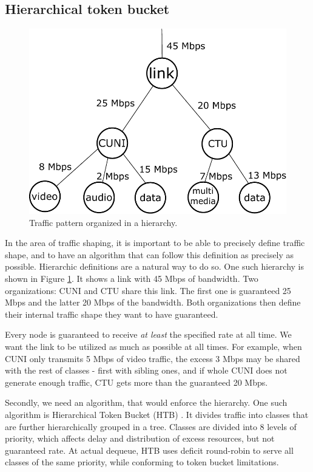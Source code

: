 \subsection{Hierarchical token bucket}
\begin{figure}
	\centering
	\includegraphics[width=137mm]{drawings/hierarchy}
	\caption{Traffic pattern organized in a hierarchy.}
	
	\label{fig10:hierarchy}
\end{figure}
In the area of traffic shaping, it is important to be able to precisely define traffic shape, and to have an algorithm that can follow this definition as precisely as possible. Hierarchic definitions are a natural way to do so. One such hierarchy is shown in Figure \ref{fig10:hierarchy}. It shows a link with 45 Mbps of bandwidth. Two organizations: CUNI and CTU share this link. The first one is guaranteed 25 Mbps and the latter 20 Mbps of the bandwidth. Both organizations then define their internal traffic shape they want to have guaranteed.

Every node is guaranteed to receive \textit{at least} the specified rate at all time. We want the link to be utilized as much as possible at all times. For example, when CUNI only transmits 5 Mbps of video traffic, the excess 3 Mbps may be shared with the rest of classes - first with sibling ones, and if whole CUNI does not generate enough traffic, CTU gets more than the guaranteed 20 Mbps.


Secondly, we need an algorithm, that would enforce the hierarchy. One such algorithm is Hierarchical Token Bucket (HTB) \cite{HTB}. It divides traffic into classes that are further hierarchically grouped in a tree. Classes are divided into 8 levels of priority, which affects delay and distribution of excess resources, but not guaranteed rate. At actual dequeue, HTB uses deficit round-robin to serve all classes of the same priority, while conforming to token bucket limitations.

